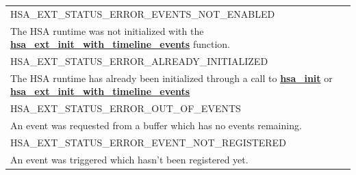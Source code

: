 \documentclass[final,oneside]{book}
\newcommand{\reffun}[1]{\textbf{#1}}
\newcommand{\reftyp}[1]{#1}
\newcommand{\refenu}[1]{\reftyp{#1}}
\begin{document}
\begin{longtable}{@{\hspace{2em}}p{\linewidth-2em}}
\hspace{-2em}\refenu{HSA_\-EXT_\-STATUS_\-ERROR_\-EVENTS_\-NOT_\-ENABLED}\\The HSA runtime was not initialized with the \hyperlink{group__ext-event-system_1gac544795581d7e0f66a7f51c528a43351}{\reffun{hsa_\-ext_\-init_\-with_\-timeline_\-events}} function.\\[2mm]
\hspace{-2em}\refenu{HSA_\-EXT_\-STATUS_\-ERROR_\-ALREADY_\-INITIALIZED}\\The HSA runtime has already been initialized through a call to \hyperlink{group__initshutdown_1ga5b8574433e7dbcbd31ea397a02e3c32b}{\reffun{hsa_\-init}} or \hyperlink{group__ext-event-system_1gac544795581d7e0f66a7f51c528a43351}{\reffun{hsa_\-ext_\-init_\-with_\-timeline_\-events}}\\[2mm]
\hspace{-2em}\refenu{HSA_\-EXT_\-STATUS_\-ERROR_\-OUT_\-OF_\-EVENTS}\\An event was requested from a buffer which has no events remaining.\\[2mm]
\hspace{-2em}\refenu{HSA_\-EXT_\-STATUS_\-ERROR_\-EVENT_\-NOT_\-REGISTERED}\\An event was triggered which hasn't been registered yet.
\end{longtable}
\end{document}
